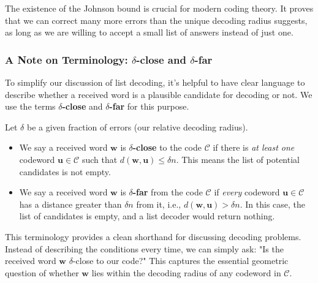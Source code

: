 \documentclass{article}
\begin{document}
The existence of the Johnson bound is crucial for modern coding theory. It proves that we can correct many more errors than the unique decoding radius suggests, as long as we are willing to accept a small list of answers instead of just one.




\subsubsection{A Note on Terminology: $\delta$-close and $\delta$-far}
To simplify our discussion of list decoding, it's helpful to have clear language to describe whether a received word is a plausible candidate for decoding or not. We use the terms \textbf{$\delta$-close} and \textbf{$\delta$-far} for this purpose.

\begin{tcolorbox}[breakable, title={Definitions}]
Let $\delta$ be a given fraction of errors (our relative decoding radius).
\begin{itemize}
    \item We say a received word $\mathbf{w}$ is \textbf{$\delta$-close} to the code $\mathcal{C}$ if there is \textit{at least one} codeword $\mathbf{u} \in \mathcal{C}$ such that $d(\mathbf{w}, \mathbf{u}) \le \delta n$. This means the list of potential candidates is not empty.

    \item We say a received word $\mathbf{w}$ is \textbf{$\delta$-far} from the code $\mathcal{C}$ if \textit{every} codeword $\mathbf{u} \in \mathcal{C}$ has a distance greater than $\delta n$ from it, i.e., $d(\mathbf{w}, \mathbf{u}) > \delta n$. In this case, the list of candidates is empty, and a list decoder would return nothing.
\end{itemize}
\end{tcolorbox}

This terminology provides a clean shorthand for discussing decoding problems. Instead of describing the conditions every time, we can simply ask: "Is the received word $\mathbf{w}$ $\delta$-close to our code?" This captures the essential geometric question of whether $\mathbf{w}$ lies within the decoding radius of any codeword in $\mathcal{C}$.


\end{document}
